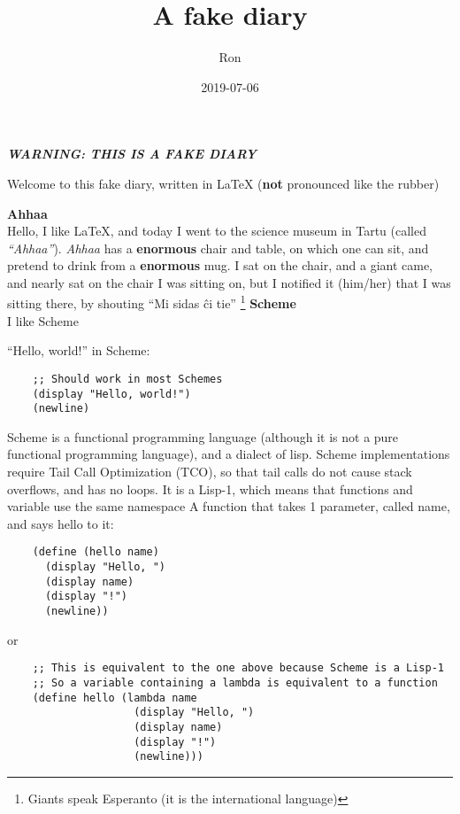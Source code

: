 \documentclass[UTF8]{tufte-book}
\title{A fake diary}
\author{Ron}
\date{2019-07-06}
\newcommand{\warning}[1]{\textbf{\textit{WARNING: #1}}}
\newcommand{\called}[1]{called \textit{#1}}
\newenvironment{entry}[2] %
{\noindent\textbf{#2}\marginnote{#1}\\}{\vspace{0.5cm}}
\begin{document}
\frontmatter
\maketitle
\doclicenseThis
\newpage
\warning{THIS IS A FAKE DIARY}

Welcome to this fake diary, written in \LaTeX{} (\textbf{not} pronounced like the rubber)

\begin{entry}{2020-07-06}{Ahhaa}
  Hello, I like \LaTeX, and today I went to the science museum in Tartu (\called{``Ahhaa''}).
  \textit{Ahhaa} has a \textbf{enormous} chair and table, on which one can sit, and pretend to drink from a \textbf{enormous} mug.
  I sat on the chair, and a giant came, and nearly sat on the chair I was sitting on,
  but I notified it (him/her) that I was sitting there,
  by shouting ``Mi sidas \^ci tie'' \footnote{Giants speak Esperanto (it is the international language)}\newline
\end{entry}
\begin{entry}{2020-07-07}{Scheme}
  I like Scheme
  
  ``Hello, world!'' in Scheme:
  \begin{verbatim}
    ;; Should work in most Schemes
    (display "Hello, world!")
    (newline)
  \end{verbatim}
  Scheme is a functional programming language (although it is not a pure functional programming language), and a dialect of lisp.
  Scheme implementations require Tail Call Optimization (TCO), so that tail calls do not cause stack overflows, and has no loops.
  It is a Lisp-1, which means that functions and variable use the same namespace\newline
  A function that takes 1 parameter, called name, and says hello to it:
  \begin{verbatim}
    (define (hello name)
      (display "Hello, ")
      (display name)
      (display "!")
      (newline))
  \end{verbatim}
  or
  \begin{verbatim}
    ;; This is equivalent to the one above because Scheme is a Lisp-1
    ;; So a variable containing a lambda is equivalent to a function
    (define hello (lambda name
                    (display "Hello, ")
                    (display name)
                    (display "!")
                    (newline)))
  \end{verbatim}
\end{entry}
\end{document}
